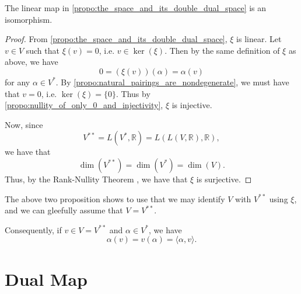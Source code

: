 \documentclass[notoc,notitlepage]{tufte-book}
\begin{document}
\begin{propo}\label{propo:isomorphism_between_the_space_and_its_dual_space}
  The linear map in \cref{propo:the_space_and_its_double_dual_space} is an isomorphism.
\end{propo}

\begin{proof}
  From \cref{propo:the_space_and_its_double_dual_space}, $\xi$ is linear.
  Let $v \in V$ such that $\xi(v) = 0$, i.e. $v \in \ker(\xi)$.
  Then by the same definition of $\xi$ as above, we have
  \begin{equation*}
    0 = (\xi(v))(\alpha) = \alpha(v)
  \end{equation*}
  for any $\alpha \in V^*$.
  By \cref{propo:natural_pairings_are_nondegenerate}, we must have that $v = 0$,
  i.e. $\ker(\xi) = \{ 0 \}$.
  Thus by \cref{propo:nullity_of_only_0_and_injectivity}, $\xi$ is injective.

  Now, since
  \begin{equation*}
    V^{**} = L(V^*, \mathbb{R}) = L ( L ( V, \mathbb{R} ), \mathbb{R} ),
  \end{equation*}
  we have that
  \begin{equation*}
    \dim(V^{**}) = \dim(V^*) = \dim(V).
  \end{equation*}
  Thus, by the Rank-Nullity Theorem
  ,
  we have that $\xi$ is surjective.

  
\end{proof}

The above two proposition shows to use that we may
identify $V$ with $V^{**}$ using $\xi$, and we can
gleefully assume that $V = V^{**}$.

Consequently, if $v \in V = V^{**}$ and $\alpha \in V^*$,
we have
\begin{equation}\label{eq:commutativity_of_the_vector_and_its_linear_operator}
  \alpha(v) = v(\alpha) = \langle \alpha, v \rangle.
\end{equation}


\section{Dual Map}%
\label{sec:dual_map}
\end{document}
